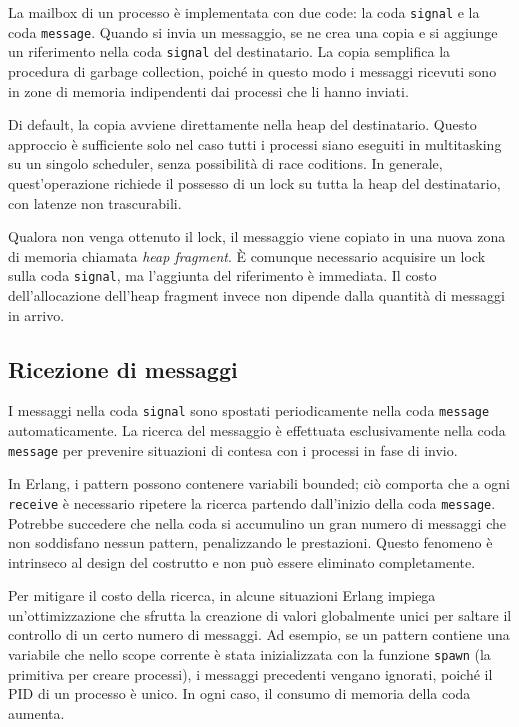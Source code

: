 \documentclass[target=bach,aauheader=,style=]{thud}
\newcommand{\eng}[1]{\foreignlanguage{english}{#1}}
\begin{document}
La \eng{mailbox} di un processo è implementata con due code: la coda \lstinline{signal} e la coda \lstinline{message}. Quando si invia un messaggio, se ne crea una copia e si aggiunge un riferimento nella coda \lstinline{signal} del destinatario. La copia semplifica la procedura di \eng{garbage collection}, poiché in questo modo i messaggi ricevuti sono in zone di memoria indipendenti dai processi che li hanno inviati. 

Di default, la copia avviene direttamente nella \eng{heap} del destinatario. Questo approccio è sufficiente solo nel caso tutti i processi siano eseguiti in \eng{multitasking} su un singolo scheduler, senza possibilità di \eng{race coditions}. In generale, quest'operazione richiede il possesso di un lock su tutta la \eng{heap} del destinatario, con latenze non trascurabili.

Qualora non venga ottenuto il lock, il messaggio viene copiato in una nuova zona di memoria chiamata \emph{\eng{heap fragment}}. È comunque necessario acquisire un lock sulla coda \lstinline{signal}, ma l'aggiunta del riferimento è immediata. Il costo dell'allocazione dell'\eng{heap fragment} invece non dipende dalla quantità di messaggi in arrivo. 

\subsection{Ricezione di messaggi}

I messaggi nella coda \lstinline{signal} sono spostati periodicamente nella coda \lstinline{message} automaticamente. La ricerca del messaggio è effettuata esclusivamente nella coda \lstinline{message} per prevenire situazioni di contesa con i processi in fase di invio.

In Erlang, i pattern possono contenere variabili \eng{bounded}; ciò comporta che a ogni \lstinline{receive} è necessario ripetere la ricerca partendo dall'inizio della coda \lstinline{message}. Potrebbe succedere che nella coda si accumulino un gran numero di messaggi che non soddisfano nessun pattern, penalizzando le prestazioni. Questo fenomeno è intrinseco al design del costrutto e non può essere eliminato completamente.

Per mitigare il costo della ricerca, in alcune situazioni Erlang impiega un'ottimizzazione che sfrutta la creazione di valori globalmente unici per saltare il controllo di un certo numero di messaggi. Ad esempio, se un pattern contiene una variabile che nello \eng{scope} corrente è stata inizializzata con la funzione \lstinline{spawn} (la primitiva per creare processi), i messaggi precedenti vengano ignorati, poiché il PID di un processo è unico. In ogni caso, il consumo di memoria della coda aumenta.
\bigskip
\end{document}
